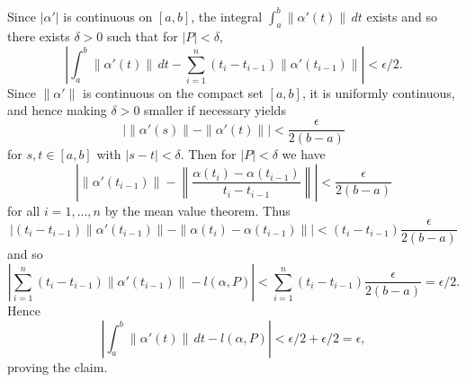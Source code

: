 \begin{ex}
Since $|\alpha'|$ is continuous on $[a, b]$, the integral $\int_a^b\|\alpha'(t)\|\,dt$ exists and so there exists $\delta > 0$ such that for $|P| < \delta$, \[\left|\int_a^b\|\alpha'(t)\|\,dt - \sum_{i = 1}^n(t_i-t_{i-1})\|\alpha'(t_{i-1})\|\right| < \epsilon/2.\] Since $\|\alpha'\|$ is continuous on the compact set $[a, b]$, it is uniformly continuous, and hence making $\delta > 0$ smaller if necessary yields \[|\|\alpha'(s)\|-\|\alpha'(t)\|| < \frac{\epsilon}{2(b-a)}\] for $s, t \in [a, b]$ with $|s-t| < \delta$. Then for $|P| < \delta$ we have \[\left|\|\alpha'(t_{i-1})\| - \left\|\frac{\alpha(t_i)-\alpha(t_{i-1})}{t_i-t_{i-1}}\right\|\right| < \frac{\epsilon}{2(b-a)}\] for all $i = 1, \ldots, n$ by the mean value theorem. Thus \[|(t_i-t_{i-1})\|\alpha'(t_{i-1})\| - \|\alpha(t_i)-\alpha(t_{i-1})\|| < (t_i-t_{i-1})\frac{\epsilon}{2(b-a)}\] and so \[\left|\sum_{i = 1}^n(t_i-t_{i-1})\|\alpha'(t_{i-1})\| - l(\alpha, P)\right| < \sum_{i = 1}^n(t_i-t_{i-1})\frac{\epsilon}{2(b-a)} = \epsilon/2.\] Hence \[\left|\int_a^b\|\alpha'(t)\|\,dt - l(\alpha, P)\right| < \epsilon/2 + \epsilon/2 = \epsilon,\] proving the claim.
\end{ex}

